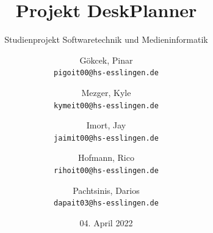 \documentclass[
    12pt,
    headings=big,
    version=first,
    ngerman,
    a4paper,
    BCOR=5mm,
    DIV=14,
    1headlines,
    pagesize,
    oneside,
    openright,
    titlepage,
    headsepline,
    chapterprefix=false,
    bibliography=totoc,
    toc=graduated,
    listof=graduated,
    numbers=noenddot,
    cleardoublepage=empty,
    fleqn,
    parskip=half,
]{scrbook}
\title{Projekt DeskPlanner}
\subtitle{Studienprojekt Softwaretechnik und Medieninformatik}
\author{
Gökcek, Pinar\\
\texttt{pigoit00@hs-esslingen.de}
\and
Mezger, Kyle\\
\texttt{kymeit00@hs-esslingen.de}
\and
Imort, Jay\\
\texttt{jaimit00@hs-esslingen.de}
\and
Hofmann, Rico\\
\texttt{rihoit00@hs-esslingen.de}
\and
Pachtsinis, Darios\\
\texttt{dapait03@hs-esslingen.de}
}
\date{04. April 2022}
\begin{document}
\begin{titlepage}
    \centering
    \maketitle

    \thispagestyle{empty}

    \vfill

\end{titlepage}

\tableofcontents

\pagebreak

% 










% 


\end{document}
